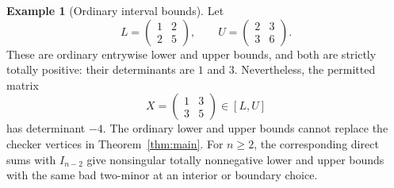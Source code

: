 \documentclass[10pt,a4paper]{article}
\theoremstyle{definition}
\newtheorem{example}[theorem]{Example}
\theoremstyle{remark}
\numberwithin{equation}{section}
\begin{document}
\begin{example}[Ordinary interval bounds]\label{ex:ordinary}
Let
\[
 L=\begin{pmatrix}1&2\\2&5\end{pmatrix},\qquad
 U=\begin{pmatrix}2&3\\3&6\end{pmatrix}.
\]
These are ordinary entrywise lower and upper bounds, and both
are strictly totally positive: their determinants are $1$ and $3$.
Nevertheless, the permitted matrix
\[
 X=\begin{pmatrix}1&3\\3&5\end{pmatrix}\in[L,U]
\]
has determinant $-4$. The ordinary lower and upper bounds
cannot replace the checker vertices in Theorem~\ref{thm:main}.
For $n\geq2$, the corresponding direct sums with $I_{n-2}$
give nonsingular totally nonnegative lower and upper bounds
with the same bad two-minor at an interior or boundary choice.
\end{example}
\end{document}
